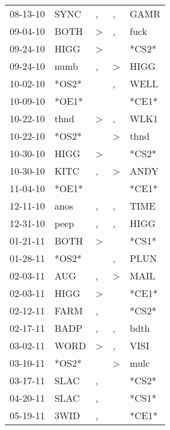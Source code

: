 \begin{supertabular}{lllll}
 08-13-10 &   SYNC &                , &                , &   GAMR \\
 09-04-10 &   BOTH &     \textgreater &                , &   fuck \\
 09-24-10 &   HIGG &     \textgreater &                  &  *CS2* \\
 09-24-10 &   numb &                , &     \textgreater &   HIGG \\
 10-02-10 &  *OS2* &                  &                , &   WELL \\
 10-09-10 &  *OE1* &                  &                  &  *CE1* \\
 10-22-10 &   thnd &     \textgreater &                , &   WLK1 \\
 10-22-10 &  *OS2* &                  &     \textgreater &   thnd \\
 10-30-10 &   HIGG &     \textgreater &                  &  *CS2* \\
 10-30-10 &   KITC &                , &     \textgreater &   ANDY \\
 11-04-10 &  *OE1* &                  &                  &  *CE1* \\
 12-11-10 &   anos &                , &                , &   TIME \\
 12-31-10 &   peep &                , &                , &   HIGG \\
 01-21-11 &   BOTH &     \textgreater &                  &  *CS1* \\
 01-28-11 &  *OS2* &                  &                , &   PLUN \\
 02-03-11 &    AUG &                , &     \textgreater &   MAIL \\
 02-03-11 &   HIGG &     \textgreater &                  &  *CE1* \\
 02-12-11 &   FARM &                , &                  &  *CS2* \\
 02-17-11 &   BADP &                , &                , &   bdth \\
 03-02-11 &   WORD &     \textgreater &                , &   VISI \\
 03-10-11 &  *OS2* &                  &     \textgreater &   mulc \\
 03-17-11 &   SLAC &                , &                  &  *CS2* \\
 04-20-11 &   SLAC &                , &                  &  *CS1* \\
 05-19-11 &   3WID &                , &                  &  *CE1* \\

\end{supertabular}
